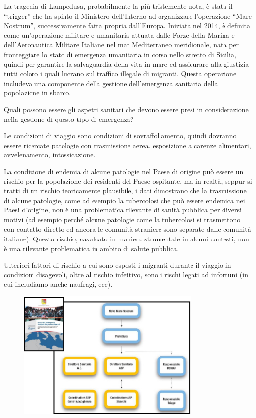 La tragedia di Lampedusa, probabilmente la più tristemente nota, è stata
il ``trigger'' che ha spinto il Ministero dell'Interno ad organizzare
l'operazione ``Mare Nostrum'', successivamente fatta propria
dall'Europa. Iniziata nel 2014, è definita come un'operazione militare e
umanitaria attuata dalle Forze della Marina e dell'Aeronautica Militare
Italiane nel mar Mediterraneo meridionale, nata per fronteggiare lo
stato di emergenza umanitaria in corso nello stretto di Sicilia, quindi
per garantire la salvaguardia della vita in mare ed assicurare alla
giustizia tutti coloro i quali lucrano sul traffico illegale di
migranti. Questa operazione includeva una componente della gestione
dell'emergenza sanitaria della popolazione in sbarco.

Quali possono essere gli aspetti sanitari che devono essere presi in
considerazione nella gestione di questo tipo di emergenza?

Le condizioni di viaggio sono condizioni di sovraffollamento, quindi
dovranno essere ricercate patologie con trasmissione aerea, esposizione
a carenze alimentari, avvelenamento, intossicazione.

La condizione di endemia di alcune patologie nel Paese di origine può
essere un rischio per la popolazione dei residenti del Paese ospitante,
ma in realtà, seppur si tratti di un rischio teoricamente plausibile, i
dati dimostrano che la trasmissione di alcune patologie, come ad esempio
la tubercolosi che può essere endemica nei Paesi d'origine, non è una
problematica rilevante di sanità pubblica per diversi motivi (ad esempio
perché alcune patologie come la tubercolosi si trasmettono con contatto
diretto ed ancora le comunità straniere sono separate dalle comunità
italiane). Questo rischio, cavalcato in maniera strumentale in alcuni
contesti, non è una rilevante problematica in ambito di salute pubblica.

Ulteriori fattori di rischio a cui sono esposti i migranti durante il
viaggio in condizioni disagevoli, oltre al rischio infettivo, sono i
rischi legati ad infortuni (in cui includiamo anche naufragi, ecc).

\begin{figure}[!ht]
\centering
	\includegraphics[width=0.8\textwidth]{26/image16.jpeg}
	\end{figure}
	
